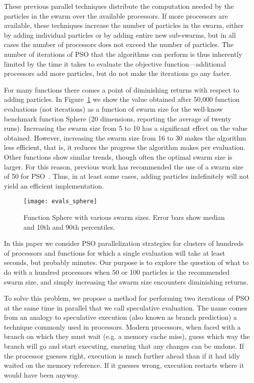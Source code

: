 \documentclass{llncs}
\newcommand{\fig}[1]{Figure~\ref{fig:#1}}
\begin{document}
These previous parallel techniques distribute the computation needed by the
particles in the swarm over the available processors.  If more processors are
available, these techniques increase the number of particles in the swarm,
either by adding individual particles or by adding entire new sub-swarms, but
in all cases the number of processors does not exceed the number of particles.
The number of iterations of PSO that the algorithms can perform is thus
inherently limited by the time it takes to evaluate the objective
function---additional processors add more particles, but do not make the
iterations go any faster.

For many functions there comes a point of diminishing returns with respect to
adding particles.  In \fig{evals-sphere} we show the value obtained after
50,000 function evaluations (not iterations) as a function of swarm size for
the well-know benchmark function Sphere (20 dimensions, reporting the average
of twenty runs).  Increasing the swarm size from 5 to 10 has a significant
effect on the value obtained.  However, increasing the swarm size from 16 to 30
makes the algorithm less efficient, that is, it reduces the progress the
algorithm makes per evaluation.  Other functions show similar trends, though
often the optimal swarm size is larger.  For this reason, previous
work has recommended the use of a swarm size of 50 for
PSO~\cite{bratton-2007-defining-a-standard-for-pso}.  Thus, in at least some
cases, adding particles indefinitely will not yield an efficient
implementation. 

\begin{figure}
  \centering
  \texttt{[image: evals\_sphere]}
  \caption{Function Sphere with various swarm sizes. Error bars show median and
  10th and 90th percentiles.}
  \label{fig:evals-sphere}
\end{figure}

In this paper we consider PSO parallelization strategies for clusters of
hundreds of processors and functions for which a single evaluation will take
at least seconds, but probably minutes.  Our purpose
is to explore the question of what to do with a hundred processors when 50 or
100 particles is the recommended swarm size, and simply increasing the swarm
size encounters diminishing returns.

To solve this problem, we propose a method for performing two iterations of PSO
at the same time in parallel that we call speculative evaluation.  The name
comes from an analogy to speculative execution (also known as branch
prediction) a technique commonly used in processors.  Modern processors, when
faced with a branch on which they must wait (e.g. a memory cache miss), guess
which way the branch will go and start executing, ensuring that any changes
can be undone.  If the processor guesses right, execution is
much farther ahead than if it had idly waited on the memory reference.  If
it guesses wrong, execution restarts where it would have been anyway.  
\end{document}
